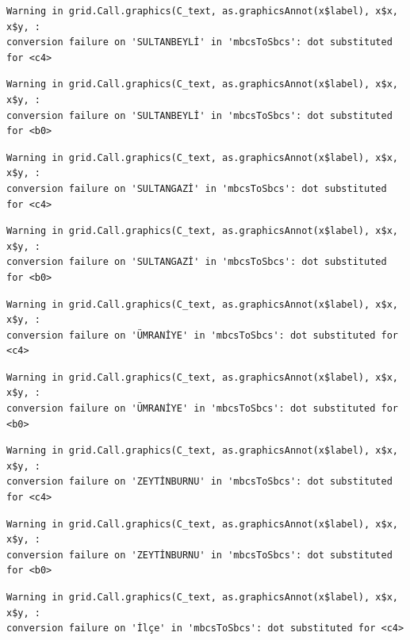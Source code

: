 \documentclass[
  11pt,
  a4paper,
  DIV=11,
  numbers=noendperiod]{scrartcl}
\begin{document}
\begin{verbatim}
Warning in grid.Call.graphics(C_text, as.graphicsAnnot(x$label), x$x, x$y, :
conversion failure on 'SULTANBEYLİ' in 'mbcsToSbcs': dot substituted for <c4>
\end{verbatim}

\begin{verbatim}
Warning in grid.Call.graphics(C_text, as.graphicsAnnot(x$label), x$x, x$y, :
conversion failure on 'SULTANBEYLİ' in 'mbcsToSbcs': dot substituted for <b0>
\end{verbatim}

\begin{verbatim}
Warning in grid.Call.graphics(C_text, as.graphicsAnnot(x$label), x$x, x$y, :
conversion failure on 'SULTANGAZİ' in 'mbcsToSbcs': dot substituted for <c4>
\end{verbatim}

\begin{verbatim}
Warning in grid.Call.graphics(C_text, as.graphicsAnnot(x$label), x$x, x$y, :
conversion failure on 'SULTANGAZİ' in 'mbcsToSbcs': dot substituted for <b0>
\end{verbatim}

\begin{verbatim}
Warning in grid.Call.graphics(C_text, as.graphicsAnnot(x$label), x$x, x$y, :
conversion failure on 'ÜMRANİYE' in 'mbcsToSbcs': dot substituted for <c4>
\end{verbatim}

\begin{verbatim}
Warning in grid.Call.graphics(C_text, as.graphicsAnnot(x$label), x$x, x$y, :
conversion failure on 'ÜMRANİYE' in 'mbcsToSbcs': dot substituted for <b0>
\end{verbatim}

\begin{verbatim}
Warning in grid.Call.graphics(C_text, as.graphicsAnnot(x$label), x$x, x$y, :
conversion failure on 'ZEYTİNBURNU' in 'mbcsToSbcs': dot substituted for <c4>
\end{verbatim}

\begin{verbatim}
Warning in grid.Call.graphics(C_text, as.graphicsAnnot(x$label), x$x, x$y, :
conversion failure on 'ZEYTİNBURNU' in 'mbcsToSbcs': dot substituted for <b0>
\end{verbatim}

\begin{verbatim}
Warning in grid.Call.graphics(C_text, as.graphicsAnnot(x$label), x$x, x$y, :
conversion failure on 'İlçe' in 'mbcsToSbcs': dot substituted for <c4>
\end{verbatim}
\end{document}
